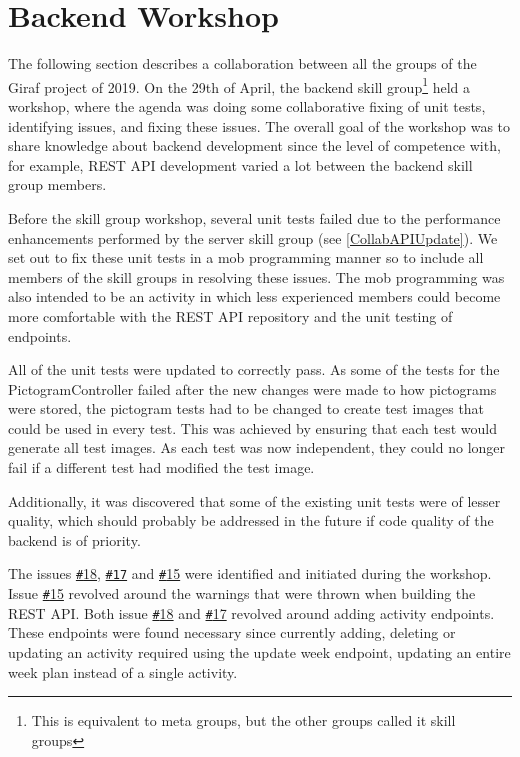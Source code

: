 \section{Backend Workshop} \label{SEC:workshopAPIcollab}
The following section describes a collaboration between all the groups of the Giraf project of 2019. 
On the 29th of April, the backend skill group\footnote{This is equivalent to meta groups, but the other groups called it skill groups} held a workshop, where the agenda was doing some collaborative fixing of unit tests, identifying issues, and fixing these issues. 
The overall goal of the workshop was to share knowledge about backend development since the level of competence with, for example, REST API development varied a lot between the backend skill group members.

Before the skill group workshop, several unit tests failed due to the performance enhancements performed by the server skill group (see \autoref{CollabAPIUpdate}). 
We set out to fix these unit tests in a mob programming manner so to include all members of the skill groups in resolving these issues.
The mob programming was also intended to be an activity in which less experienced members could become more comfortable with the REST API repository and the unit testing of endpoints.

All of the unit tests were updated to correctly pass.
As some of the tests for the PictogramController failed after the new changes were made to how pictograms were stored, the pictogram tests had to be changed to create test images that could be used in every test.
This was achieved by ensuring that each test would generate all test images.
As each test was now independent, they could no longer fail if a different test had modified the test image.

Additionally, it was discovered that some of the existing unit tests were of lesser quality, which should probably be addressed in the future if code quality of the backend is of priority.

The issues \href{https://github.com/aau-giraf/web-api/issues/18}{\texttt{\#}18}, \href{https://github.com/aau-giraf/web-api/issues/17}{\texttt{\#17}} and \href{https://github.com/aau-giraf/web-api/issues/15}{\texttt{\#}15} were identified and initiated during the workshop.
Issue \href{https://github.com/aau-giraf/web-api/issues/15}{\texttt{\#}15} revolved around the warnings that were thrown when building the REST API.
Both issue \href{https://github.com/aau-giraf/web-api/issues/18}{\texttt{\#}18} and \href{https://github.com/aau-giraf/web-api/issues/17}{\texttt{\#}17} revolved around adding activity endpoints.
These endpoints were found necessary since currently adding, deleting or updating an activity required using the update week endpoint, updating an entire week plan instead of a single activity. 
 
